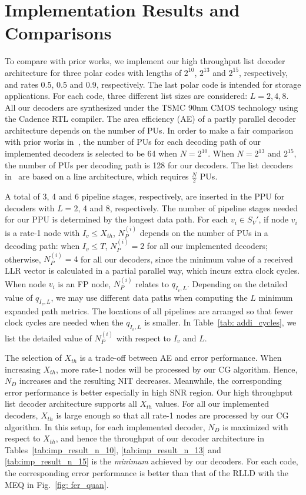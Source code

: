 \documentclass[journal]{IEEEtran}
\begin{document}
\section{Implementation Results and Comparisons} \label{sec: imp_results}
To compare with prior works, we implement our high throughput list decoder architecture for three polar codes with lengths of $2^{10}$, $2^{13}$ and $2^{15}$, respectively, and rates 0.5, 0.5 and 0.9, respectively. The last polar code is intended for storage applications. For each code, three different list sizes are considered: $L=2,4,8$. All our decoders are synthesized under the TSMC 90nm CMOS technology using the Cadence RTL compiler. The area efficiency (AE) of a partly parallel decoder architecture depends on the number of PUs. In order to make a fair comparison with prior works in~\cite{llr_list_tsp,jun_low_mem_list,chenrong_tsp}, the number of PUs for each decoding path of our implemented decoders is selected to be 64 when $N=2^{10}$. When $N=2^{13}$ and $2^{15}$, the number of PUs per decoding path is 128 for our decoders. The list decoders in~\cite{yuan_polar} are based on a line architecture, which requires $\frac{N}{2}$ PUs.

A total of 3, 4 and 6 pipeline stages, respectively, are inserted in the PPU for decoders with $L=2$, 4 and 8, respectively. The number of pipeline stages needed for our PPU is determined by the longest data path. For each $v_i\in S_V'$, if node $v_i$ is a rate-1 node with $I_v \leqslant X_{th}$, $N_P^{(i)}$ depends on the number of PUs in a decoding path: when $I_v \leqslant T$, $N_P^{(i)}=2$ for all our implemented decoders; otherwise, $N_P^{(i)}=4$ for all our decoders, since the minimum value of a received LLR vector is calculated in a partial parallel way, which incurs extra clock cycles. When node $v_i$ is an FP node, $N_P^{(i)}$ relates to $q_{I_v,L}$. Depending on the detailed value of $q_{I_v,L}$, we may use different data paths when computing the $L$ minimum expanded path metrics. The locations of all pipelines are arranged so that fewer clock cycles are needed when the $q_{I_v,L}$ is smaller. In Table~\ref{tab: addi_cycles}, we list the detailed value of $N_P^{(i)}$ with respect to $I_v$ and $L$.


The selection of $X_{th}$ is a trade-off between AE and error performance. When increasing $X_{th}$, more rate-1 nodes will be processed by our CG algorithm. Hence, $N_D$ increases and the resulting NIT decreases. Meanwhile, the corresponding error performance is better especially in high SNR region. Our high throughput list decoder architecture supports all $X_{th}$ values. For all our implemented decoders, $X_{th}$ is large enough so that all rate-1 nodes are processed by our CG algorithm. In this setup, for each implemented decoder, $N_D$ is maximized with respect to $X_{th}$, and hence the throughput of our decoder architecture in Tables~\ref{tab:imp_result_n_10}, \ref{tab:imp_result_n_13} and \ref{tab:imp_result_n_15} is the \emph{minimum} achieved by our decoders. For each code, the corresponding error performance is better than that of the RLLD with the MEQ in Fig.~\ref{fig: fer_quan}.
\end{document}
